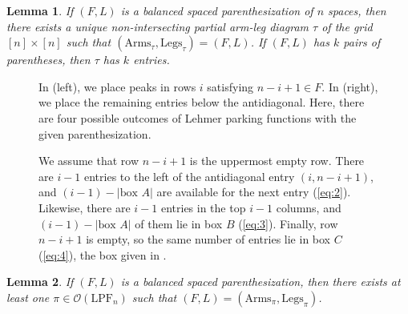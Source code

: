 \documentclass[10pt,a4paper]{amsart}
\newtheorem{lemma}{Lemma}
\newcommand{\IT}{\mathrm{LPF}}
\newcommand{\Out}{\mathcal{O}}
\newcommand{\arms}{\mathrm{Arms}}
\newcommand{\legs}{\mathrm{Legs}}
\begin{document}
\begin{lemma}\label{lem:balanced -> non-intersecting partial}
    If $(F,L)$ is a balanced spaced parenthesization of $n$ spaces, then there exists a unique non-intersecting partial arm-leg diagram $\tau$ of the grid $[n]\times[n]$ such that $(\arms_\tau,\legs_\tau)=(F,L)$. If $(F,L)$ has $k$ pairs of parentheses, then $\tau$ has $k$ entries. 
\end{lemma}

\begin{figure}[H]
    \centering
    
    \caption{In  (left), we place peaks in rows $i$ satisfying $n-i+1\in F$. In  (right), we place the remaining entries below the antidiagonal. Here, there are four possible outcomes of Lehmer parking functions with the given parenthesization.}
    \label{fig:algorithm for below antidiagonal}
\end{figure}

\begin{figure}[H]
    \centering
    
    \caption{We assume that row $n-i+1$ is the uppermost empty row. There are $i-1$ entries to the left of the antidiagonal entry $(i,n-i+1)$, and $(i-1)-|\text{box }A|$ are available for the next entry (\cref{eq:2}). Likewise, there are $i-1$ entries in the top $i-1$ columns, and $(i-1)-|\text{box }A|$ of them lie in box $B$ (\cref{eq:3}). Finally, row $n-i+1$ is empty, so the same number of entries lie in box $C$ (\cref{eq:4}), the box given in .}
    \label{fig:proof_3.6}
\end{figure}

\begin{lemma}\label{lem:Phi is surjective}
    If $(F,L)$ is a balanced spaced parenthesization, then there exists at least one 
    $\pi \in \Out(\IT_n)$ such that $(F,L)=(\arms_\pi,\legs_\pi)$.
\end{lemma}
\end{document}
